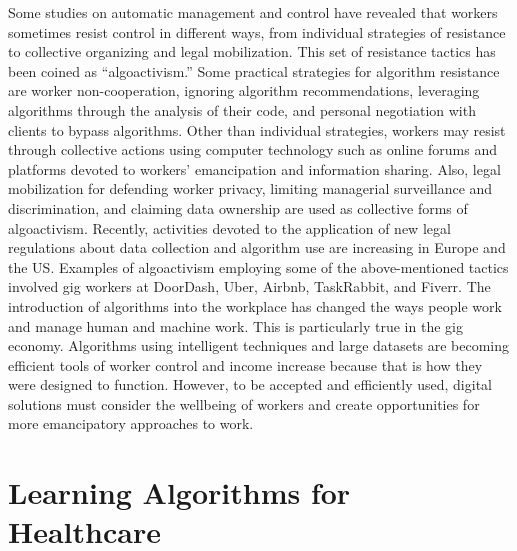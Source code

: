 Some studies on automatic management and control have revealed that workers sometimes resist control in different ways, from individual strategies of resistance to collective organizing and legal mobilization. This set of resistance tactics has been coined as ``algoactivism.'' Some practical strategies for algorithm resistance are worker non-cooperation, ignoring algorithm recommendations, leveraging algorithms through the analysis of their code, and personal negotiation with clients to bypass algorithms. Other than individual strategies, workers may resist through collective actions using computer technology such as online forums and platforms devoted to workers' emancipation and information sharing. Also, legal mobilization for defending worker privacy, limiting managerial surveillance and discrimination, and claiming data ownership are used as collective forms of algoactivism. Recently, activities devoted to the application of new legal regulations about data collection and algorithm use are increasing in Europe and the US. Examples of algoactivism employing some of the above-mentioned tactics involved gig workers at DoorDash, Uber, Airbnb, TaskRabbit, and Fiverr. The introduction of algorithms into the workplace has changed the ways people work and manage human and machine work. This is particularly true in the gig economy. Algorithms using intelligent techniques and large datasets are becoming efficient tools of worker control and income increase because that is how they were designed to function. However, to be accepted and efficiently used, digital solutions must consider the wellbeing of workers and create opportunities for more emancipatory approaches to work.

\section{\label{sec:6.5}Learning Algorithms for Healthcare}

